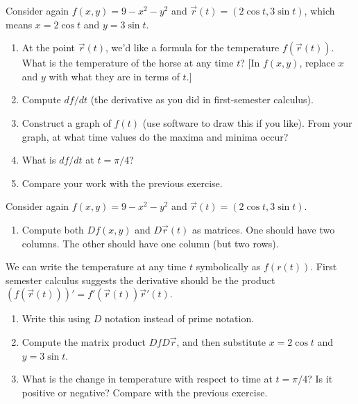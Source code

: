 

{}

\begin{problem}
 Consider again $f(x,y)=9-x^2-y^2$ and $\vec r(t)=(2\cos t, 3\sin t)$, which means $x=2\cos t$ and $y=3\sin t$. 
\begin{enumerate}
 \item At the point $\vec r(t)$, we'd like a formula for the temperature $f(\vec r(t))$. What is the temperature of the horse at any time $t$? [In $f(x,y)$, replace $x$ and $y$ with what they are in terms of $t$.]
 \item Compute $df/dt$ (the derivative as you did in first-semester calculus).
 \item Construct a graph of $f(t)$ (use software to draw this if you like). From your graph, at what time values do the maxima and minima occur?
 \item What is $df/dt$ at $t=\pi/4$?
 \item Compare your work with the previous exercise.
\end{enumerate}
\end{problem}

\begin{problem}
 Consider again $f(x,y)=9-x^2-y^2$ and $\vec r(t)=(2\cos t, 3\sin t)$.
\begin{enumerate}
 \item Compute both $Df(x,y)$ and $D\vec r(t)$ as matrices. One should have two columns.  The other should have one column (but two rows). 
\end{enumerate}
We can write the temperature at any time $t$ symbolically as $f(r(t))$.  First semester calculus suggests the derivative should be the product $(f(\vec r(t))) ' = f'(\vec r(t))\vec r'(t)$. \begin{enumerate}[resume]
	\item Write this using $D$ notation instead of prime notation.
	\item Compute the matrix product $DfD\vec r$, and then substitute $x=2\cos t$ and $y=3\sin t$.    
	\item What is the change in temperature with respect to time at $t=\pi/4$? Is it positive or negative? Compare with the previous exercise.
\end{enumerate}
\end{problem}

